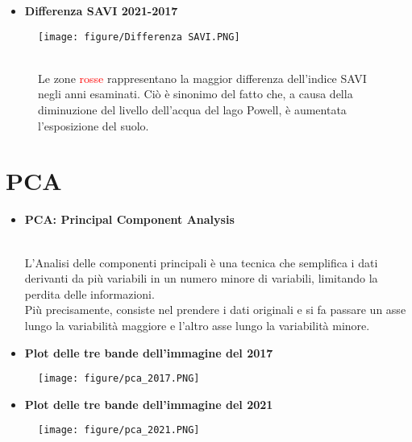 \documentclass[10pt]{beamer}
\begin{document}
\begin{frame} {}
    \begin{itemize}
      \item \textbf{Differenza SAVI 2021-2017}
    \end{itemize}
    \begin{figure}
      \bigskip 
      \texttt{[image: figure/Differenza SAVI.PNG]}
      {\\Le zone \textcolor{red}{rosse} rappresentano la maggior differenza dell'indice SAVI negli anni esaminati. Ciò è sinonimo del fatto che, a causa della diminuzione del livello dell'acqua del lago Powell, è aumentata l'esposizione del suolo.\par}
    \end{figure}
\end{frame}


\section {PCA}
\begin{frame}
    \begin{itemize}
      \item \textbf{PCA: Principal Component Analysis}
      {\\L'Analisi delle componenti principali è una tecnica che semplifica i dati derivanti da più variabili in un numero minore di variabili, limitando la perdita delle informazioni.
      \bigskip 
      \\ Più precisamente, consiste nel prendere i dati originali e si fa passare un asse lungo la variabilità maggiore e l'altro asse lungo la variabilità minore.\par} 
    \end{itemize}
\end{frame}

\begin{frame}
    \begin{itemize}
      \item \textbf{Plot delle tre bande dell'immagine del 2017}
    \end{itemize}
    \begin{figure}
      \bigskip 
      \texttt{[image: figure/pca\_2017.PNG]}
    \end{figure}
\end{frame}


\begin{frame} {}
    \begin{itemize}
      \item \textbf{Plot delle tre bande dell'immagine del 2021}
    \end{itemize}
    \begin{figure}
      \bigskip 
      \texttt{[image: figure/pca\_2021.PNG]}
    \end{figure}
\end{frame}
\end{document}
